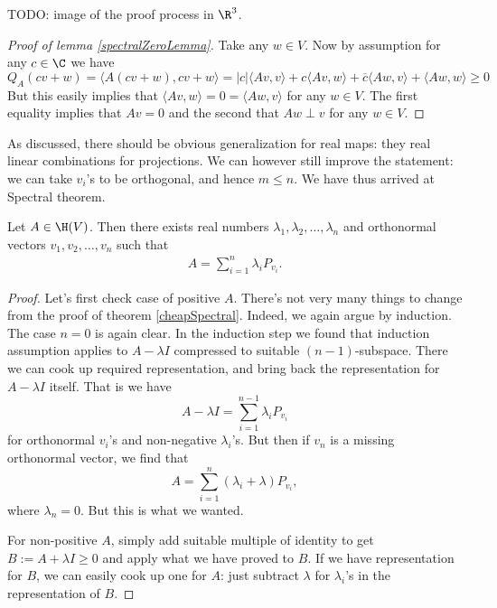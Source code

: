 TODO: image of the proof process in $\R^{3}$.

\begin{proof}[Proof of lemma \ref{spectralZeroLemma}]
	Take any $w \in V$. Now by assumption for any $c \in \C$ we have
	\[
		Q_{A}(c v + w) = \langle A (c v + w), c v + w \rangle = |c| \langle A v, v \rangle + c \langle A v, w \rangle + \overline{c} \langle A w, v \rangle + \langle A w, w \rangle \geq 0
	\]
	But this easily implies that $\langle A v, w \rangle = 0 = \langle A w, v \rangle$ for any $w \in V$. The first equality implies that $A v = 0$ and the second that $A w \perp v$ for any $w \in V$.
\end{proof}

As discussed, there should be obvious generalization for real maps: they real linear combinations for projections. We can however still improve the statement: we can take $v_{i}$'s to be orthogonal, and hence $m \leq n$. We have thus arrived at Spectral theorem.

\begin{lause}
	Let $A \in \H(V)$. Then there exists real numbers $\lambda_{1}, \lambda_{2}, \ldots, \lambda_{n}$ and orthonormal vectors $v_{1}, v_{2}, \ldots, v_{n}$ such that
	\begin{align}\label{spectralrepr}
		A = \sum_{i = 1}^{n} \lambda_{i} P_{v_{i}}.
	\end{align}
\end{lause}
\begin{proof}
	Let's first check case of positive $A$. There's not very many things to change from the proof of theorem \ref{cheapSpectral}. Indeed, we again argue by induction. The case $n = 0$ is again clear. In the induction step we found that induction assumption applies to $A - \lambda I$ compressed to suitable $(n - 1)$-subspace. There we can cook up required representation, and bring back the representation for $A - \lambda I$ itself. That is we have
	\[
		A - \lambda I = \sum_{i = 1}^{n - 1} \lambda_{i} P_{v_{i}}
	\]
	for orthonormal $v_{i}$'s and non-negative $\lambda_{i}$'s. But then if $v_{n}$ is a missing orthonormal vector, we find that
	\[
		A = \sum_{i = 1}^{n} (\lambda_{i} + \lambda) P_{v_{i}},
	\]
	where $\lambda_{n} = 0$. But this is what we wanted.

	For non-positive $A$, simply add suitable multiple of identity to get $B := A + \lambda I \geq 0$ and apply what we have proved to $B$. If we have representation for $B$, we can easily cook up one for $A$: just subtract $\lambda$ for $\lambda_{i}$'s in the representation of $B$.
\end{proof}

